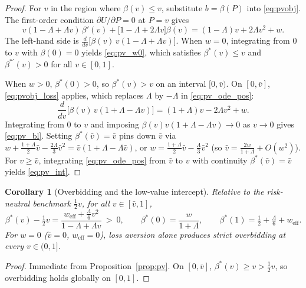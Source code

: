 \documentclass[11pt,a4paper]{article}
\newtheorem{corollary}{Corollary}
\theoremstyle{remark}
\begin{document}
\begin{proof}
For $v$ in the region where $\beta(v)\le v$, substitute $b=\beta(P)$ into
\eqref{eq:pvobj}. The first-order condition $\partial U/\partial P=0$ at $P=v$ gives
\begin{equation}
v(1-\Lambda+\Lambda v)\,\beta'(v)+\big[1-\Lambda+2\Lambda v\big]\beta(v)
=(1-\Lambda)v+2\Lambda v^{2}+w .
\label{eq:pv_ode_pos}
\end{equation}
The left-hand side is $\frac{d}{dv}\big[\beta(v)\,v(1-\Lambda+\Lambda v)\big]$.
When $w=0$, integrating from $0$ to $v$ with $\beta(0)=0$ yields \eqref{eq:pv_w0},
which satisfies $\beta^*(v)\le v$ and $\beta^{*\prime}(v)>0$ for all $v\in[0,1]$.

When $w>0$, $\beta^*(0)>0$, so $\beta^*(v)>v$ on an interval $[0,\bar v)$. On
$[0,\bar v]$, \eqref{eq:pvobj_loss} applies, which replaces $\Lambda$ by $-\Lambda$
in \eqref{eq:pv_ode_pos}:
\begin{equation}
\frac{d}{dv}\Big[\beta(v)\,v(1+\Lambda-\Lambda v)\Big]
=(1+\Lambda)v-2\Lambda v^{2}+w .
\end{equation}
Integrating from $0$ to $v$ and imposing $\beta(v)v(1+\Lambda-\Lambda v)\to 0$ as
$v\to 0$ gives \eqref{eq:pv_bl}. Setting $\beta^*(\bar v)=\bar v$ pins down $\bar v$
via $w+\tfrac{1+\Lambda}{2}\bar v-\tfrac{2\Lambda}{3}\bar v^{2}=\bar v(1+\Lambda-\Lambda\bar v)$,
or $w=\tfrac{1+\Lambda}{2}\bar v-\tfrac{\Lambda}{3}\bar v^{2}$ (so
$\bar v=\frac{2w}{1+\Lambda}+O(w^2)$). For $v\ge\bar v$, integrating
\eqref{eq:pv_ode_pos} from $\bar v$ to $v$ with continuity $\beta^*(\bar v)=\bar v$
yields \eqref{eq:pv_int}.
\end{proof}

\begin{corollary}[Overbidding and the low-value intercept]
\label{cor:pvover}
Relative to the risk-neutral benchmark $\tfrac12 v$, for all $v\in[\bar v,1]$,
\begin{equation}
\beta^{*}(v)-\tfrac12 v=\frac{w_{\mathrm{eff}}+\tfrac{\Lambda}{6}v^{2}}{1-\Lambda+\Lambda v}\ >\ 0 ,
\qquad
\beta^{*}(0)=\frac{w}{1+\Lambda},\qquad
\beta^{*}(1)=\tfrac12+\tfrac{\Lambda}{6}+w_{\mathrm{eff}} .
\end{equation}
For $w=0$ ($\bar v=0$, $w_{\mathrm{eff}}=0$), loss aversion alone produces strict
overbidding at every $v\in(0,1]$.
\end{corollary}

\begin{proof}
Immediate from Proposition~\ref{prop:pv}. On $[0,\bar v]$,
$\beta^*(v)\ge v>\tfrac12 v$, so overbidding holds globally on $[0,1]$.
\end{proof}
\end{document}
